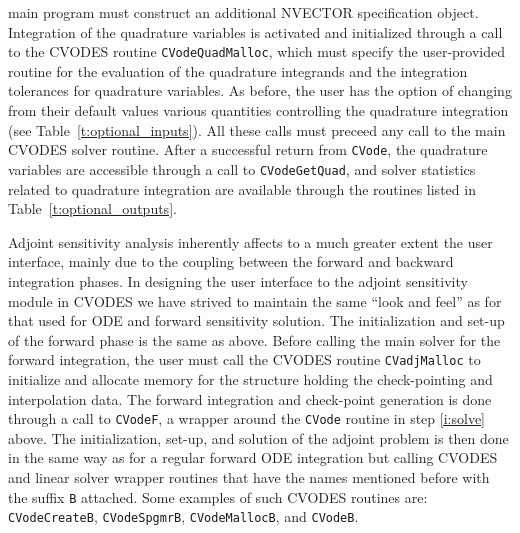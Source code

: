 main program must construct an additional NVECTOR specification object. 
Integration of the quadrature variables is activated and initialized through a 
call to the CVODES routine {\tt CVodeQuadMalloc}, which must specify the
user-provided routine for the evaluation of the quadrature integrands and
the integration tolerances for quadrature variables. As before, the user
has the option of changing from their default values various quantities
controlling the quadrature integration (see Table~\ref{t:optional_inputs}).
All these calls must preceed any call to the main CVODES solver routine.
After a successful return from {\tt CVode}, the quadrature variables are
accessible through a call to {\tt CVodeGetQuad}, and solver statistics related
to quadrature integration are available through the routines listed in
Table~\ref{t:optional_outputs}.

%
Adjoint sensitivity analysis inherently affects to a much greater extent the 
user interface, mainly due to the coupling between the forward and backward 
integration phases. 
%
In designing the user interface to the adjoint sensitivity module in CVODES we 
have strived to maintain the same ``look and feel'' as for that used for
ODE and forward sensitivity solution.
The initialization and set-up of the forward phase is the same as above.
Before calling the main solver for the forward integration, the user must 
call the CVODES routine {\tt CVadjMalloc} to initialize and allocate memory 
for the structure holding the check-pointing and interpolation data.
The forward integration and check-point generation is done through a call
to {\tt CVodeF}, a wrapper around the {\tt CVode} routine in step 
\ref{i:solve} above.
%
The initialization, set-up, and solution of the adjoint problem is then
done in the same way as for a regular forward ODE integration but
calling CVODES and linear solver wrapper routines that have the names 
mentioned before with the suffix {\tt B} attached. Some examples of such
CVODES routines are: {\tt CVodeCreateB}, {\tt CVodeSpgmrB}, {\tt CVodeMallocB},
and {\tt CVodeB}.

